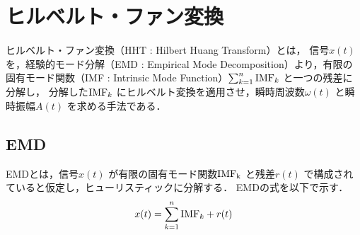 \chapter{ヒルベルト・ファン変換}
%
ヒルベルト・ファン変換（HHT : Hilbert Huang Transform）とは，
信号$x(t)$ を，経験的モード分解（EMD : Empirical Mode Decomposition）より，有限の固有モード関数（IMF : Intrinsic Mode Function）$\sum_{k=1}^{n}{\rm{IMF}}_{k}$ と一つの残差に分解し，
分解した${\rm{IMF}}_{k}$ にヒルベルト変換を適用させ，瞬時周波数$\omega(t)$ と瞬時振幅$A(t)$ を求める手法である．
%



%
\section{EMD}
%
EMDとは，信号$x(t)$ が有限の固有モード関数$\rm{IMF}_{k}$ と残差$r(t)$ で構成されていると仮定し，ヒューリスティックに分解する．
EMDの式を以下で示す．
\begin{equation}
    \label{emd}
    x(t) = \sum_{k=1}^{n} {\rm{IMF}}_{k} + r(t)
\end{equation}


